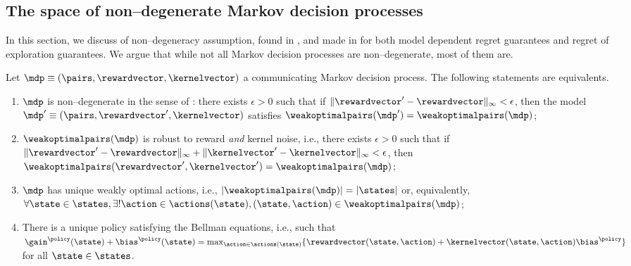 \documentclass[preprint,cleveref,12pt]{colt2025}
\newenvironment{blackblock}{
    \begin{tcolorbox}[
        enhanced,
        breakable,
        colback=black!10,
        leftrule=1mm,
        toprule=0pt,
        bottomrule=0pt,
        rightrule=0pt,
        arc=0pt,
        before skip=1em plus 2pt,
        after skip=1em plus 2pt,
    ]
}{
    \end{tcolorbox}
}
\DeclarePairedDelimiter{\braces}{\{}{\}}	%
\DeclarePairedDelimiter{\abs}{\lvert}{\rvert}	%
\DeclarePairedDelimiter{\norm}{\lVert}{\rVert}	%
\def\model{\mdp}
\def\kernel{\kernelvector}
\def\reward{\rewardvector}
\def\wkoptpairs{\weakoptimalpairs}
\begin{document}
    \subsection{The space of non--degenerate Markov decision processes}
    \label{appendix_non_degeneracy}

    In this section, we discuss of non--degeneracy assumption, found in , and made in  for both model dependent regret guarantees and regret of exploration guarantees.  
    We argue that while not all Markov decision processes are non--degenerate, most of them are. 

    \begin{blackblock}
    \begin{theorem}
    \label{theorem_characterization_non_degenerate}
        Let $\model \equiv (\pairs, \reward, \kernel)$ a communicating Markov decision process.
        The following statements are equivalents.
        \begin{enumerate}
            \item $\model$ is non--degenerate in the sense of : there exists $\epsilon > 0$ such that if $\norm{\reward' - \reward}_\infty < \epsilon$, then the model $\model' \equiv (\pairs, \reward', \kernel)$ satisfies $\wkoptpairs(\model') = \wkoptpairs(\model)$; 

            \item $\wkoptpairs(\model)$ is robust to reward \emph{and} kernel noise, i.e., there exists $\epsilon > 0$ such that if $\norm{\reward' - \reward}_\infty + \norm{\kernel' - \kernel}_\infty < \epsilon$, then $\wkoptpairs(\reward', \kernel') = \wkoptpairs(\model)$; 

            \item $\model$ has unique weakly optimal actions, i.e., $\abs{\wkoptpairs(\model)} = \abs{\states}$ or, equivalently, $\forall \state \in \states, \exists! \action \in \actions(\state), (\state, \action) \in \wkoptpairs(\model)$;

            \item There is a unique policy satisfying the Bellman equations, i.e., such that $\gain^\policy(\state) + \bias^\policy(\state) = \max_{\action \in \actions(\state)} \braces{\reward(\state, \action) + \kernel(\state, \action) \bias^\policy}$ for all $\state \in \states$. 
        \end{enumerate}
    \end{theorem}
    \end{blackblock}
\end{document}
